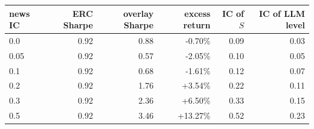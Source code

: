 \begin{tabular}{@{}lrrrrr@{}}
\toprule
news IC & ERC Sharpe & overlay Sharpe & excess return & IC of $S$ & IC of LLM level \\
\midrule
0.0 & 0.92 & 0.88 & -0.70\% & 0.09 & 0.03 \\
0.05 & 0.92 & 0.57 & -2.05\% & 0.10 & 0.05 \\
0.1 & 0.92 & 0.68 & -1.61\% & 0.12 & 0.07 \\
0.2 & 0.92 & 1.76 & +3.54\% & 0.22 & 0.11 \\
0.3 & 0.92 & 2.36 & +6.50\% & 0.33 & 0.15 \\
0.5 & 0.92 & 3.46 & +13.27\% & 0.52 & 0.23 \\
\bottomrule
\end{tabular}
